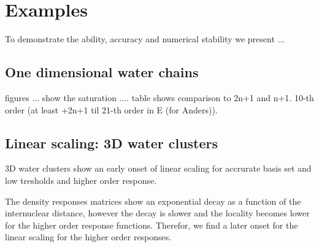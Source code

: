 \documentclass[twocolumn,showpacs,preprintnumbers,amsmath,amssymb]{revtex4}
\begin{document}
\section{Examples}
To demonstrate the ability, accuracy and numerical stability we present
...
\subsection{One dimensional water chains}
figures ... show the saturation ....
table shows comparison to 2n+1 and n+1.
10-th order (at least +2n+1 til 21-th order in E (for Anders)).
\subsection{Linear scaling: 3D water clusters}
3D water clusters show an early onset of linear scaling for accrurate
basis set and low tresholds and higher order response.

The density responses matrices show an exponential decay as a function
of the internuclear distance, however the decay is slower and the locality
becomes lower for the higher order response functions.
Therefor, we find a later onset for the linear scaling for the higher order
responses.
\end{document}
